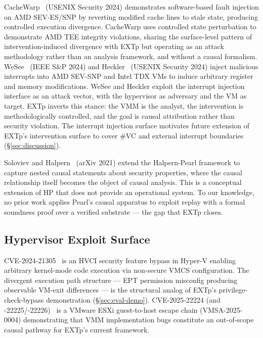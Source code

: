 \documentclass[conference]{IEEEtran}
\begin{document}
CacheWarp~\cite{zhang2024cachewarp} (USENIX Security 2024)
demonstrates software-based fault injection on AMD SEV-ES/SNP by
reverting modified cache lines to stale state, producing controlled
execution divergence. CacheWarp uses controlled state perturbation
to demonstrate AMD TEE integrity violations, sharing the
surface-level pattern of intervention-induced divergence with EXTp
but operating as an attack methodology rather than an analysis
framework, and without a causal formalism.
WeSee~\cite{schlueter2024wesee} (IEEE S\&P 2024) and
Heckler~\cite{schlueter2024heckler} (USENIX Security 2024) inject
malicious interrupts into AMD SEV-SNP and Intel TDX VMs to induce
arbitrary register and memory modifications. WeSee and Heckler
exploit the interrupt injection interface as an attack vector, with
the hypervisor as adversary and the VM as target. EXTp inverts this
stance: the VMM is the analyst, the intervention is methodologically
controlled, and the goal is causal attribution rather than security
violation. The interrupt injection surface motivates future
extension of EXTp's intervention surface to cover \#VC and external
interrupt boundaries (\S\ref{sec:discussion}).

Soloviev and Halpern~\cite{soloviev2021nested} (arXiv 2021) extend
the Halpern-Pearl framework to capture nested causal statements
about security properties, where the causal relationship itself
becomes the object of causal analysis. This is a conceptual
extension of HP that does not provide an operational system. To our
knowledge, no prior work applies Pearl's causal apparatus to exploit
replay with a formal soundness proof over a verified substrate ---
the gap that EXTp closes.

\subsection{Hypervisor Exploit Surface}

CVE-2024-21305~\cite{tandasat2024hvci} is an HVCI security feature
bypass in Hyper-V enabling arbitrary kernel-mode code execution via
non-secure VMCS configuration. The divergent execution path
structure --- EPT permission misconfig producing observable VM-exit
differences --- is the structural analog of EXTp's
privilege-check-bypass demonstration (\S\ref{sec:eval-demo}).
CVE-2025-22224 (and -22225/-22226)~\cite{broadcom2025vmsa} is a
VMware ESXi guest-to-host escape chain (VMSA-2025-0004) demonstrating
that VMM implementation bugs constitute an out-of-scope causal
pathway for EXTp's current framework.
\end{document}
